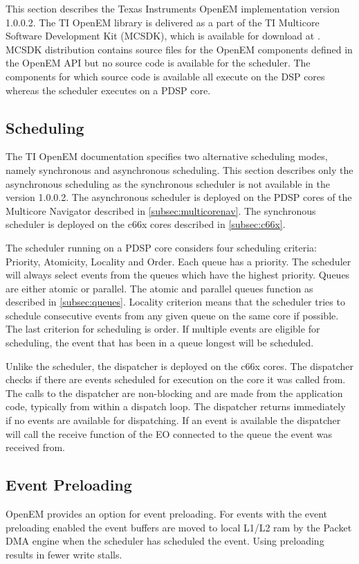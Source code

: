 This section describes the Texas Instruments OpenEM implementation version 1.0.0.2. The TI OpenEM library is delivered as a part of the TI Multicore Software Development Kit (MCSDK), which is available for download at \cite{mcsdkdown}. MCSDK distribution contains source files for the OpenEM components defined in the OpenEM API but no source code is available for the scheduler. The components for which source code is available all execute on the DSP cores whereas the scheduler executes on a PDSP core.

\subsection{Scheduling}
The TI OpenEM documentation specifies two alternative scheduling modes, namely synchronous and asynchronous scheduling. This section describes only the asynchronous scheduling as the synchronous scheduler is not available in the version 1.0.0.2. The asynchronous scheduler is deployed on the PDSP cores of the Multicore Navigator described in \ref{subsec:multicorenav}. The synchronous scheduler is deployed on the c66x cores described in \ref{subsec:c66x}.  

The scheduler running on a PDSP core considers four scheduling criteria: Priority, Atomicity, Locality and Order. Each queue has a priority. The scheduler will always select events from the queues which have the highest priority. Queues are either atomic or parallel. The atomic and parallel queues function as described in \ref{subsec:queues}. Locality criterion means that the scheduler tries to schedule consecutive events from any given queue on the same core if possible. The last criterion for scheduling is order. If multiple events are eligible for scheduling, the event that has been in a queue longest will be scheduled. \cite{openemwhite}

Unlike the scheduler, the dispatcher is deployed on the c66x cores. The dispatcher checks if there are events scheduled for execution on the core it was called from. The calls to the dispatcher are non-blocking and are made from the application code, typically from within a dispatch loop. The dispatcher returns immediately if no events are available for dispatching. If an event is available the dispatcher will call the receive function of the EO connected to the queue the event was received from. \cite{openemwhite}

\subsection{Event Preloading}
OpenEM provides an option for event preloading. For events with the event preloading enabled the event buffers are moved to local L1/L2 ram by the Packet DMA engine when the scheduler has scheduled the event. Using preloading results in fewer write stalls. \cite{openemwhite}  

